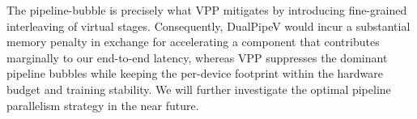The pipeline-bubble is precisely what VPP mitigates by introducing fine-grained interleaving of virtual stages.
Consequently, DualPipeV would incur a substantial memory penalty in exchange for accelerating a component that contributes marginally to our end-to-end latency, whereas VPP suppresses the dominant pipeline bubbles while keeping the per-device footprint within the hardware budget and training stability. 
We will further investigate the optimal pipeline parallelism strategy in the near future. 



